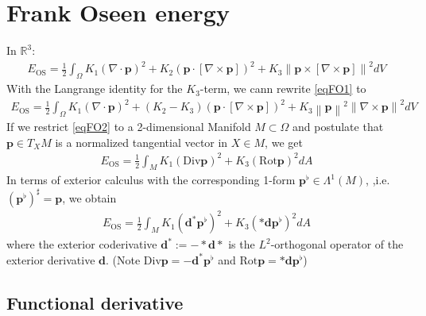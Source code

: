 \documentclass[a4paper,11pt]{scrartcl}
\newcommand{\exd}{\mathbf{d}}
\newcommand{\excod}{\exd^{*}} %
\newcommand{\Div}{\text{Div}}
\newcommand{\Rot}{\text{Rot}}
\newcommand{\R}{\mathds{R}}
\newcommand{\M}{M}
\newcommand{\dA}{dA}
\newcommand{\p}{\mathbf{p}}
\newcommand{\pfl}{\mathbf{p}^{\flat}}
\newcommand{\EOS}{E_{\text{OS}}}
\begin{document}
\tableofcontents

\section{Frank Oseen energy}

In \( \R^{3} \):
\begin{align}\label{eqFO1}
  \EOS = \frac{1}{2}\int_{\Omega} K_{1}\left( \nabla\cdot\p \right)^{2} 
                        + K_{2}\left( \p\cdot\left[ \nabla\times\p \right] \right)^{2}
                        + K_{3}\left\| \p\times\left[ \nabla\times\p \right] \right\|^{2} dV
\end{align}
With the Langrange identity for the \( K_{3} \)-term, we cann rewrite \eqref{eqFO1} to
\begin{align}\label{eqFO2}
  \EOS = \frac{1}{2}\int_{\Omega} K_{1}\left( \nabla\cdot\p \right)^{2} 
                        + (K_{2}-K_{3})\left( \p\cdot\left[ \nabla\times\p \right] \right)^{2}
                        + K_{3}\left\| \p \right\|^{2}\left\| \nabla\times\p \right\|^{2} dV
\end{align}
If we restrict \eqref{eqFO2} to a 2-dimensional Manifold \( \M\subset\Omega \) 
and postulate that \( \p\in T_{X}\M \) is a normalized tangential vector in \( X\in\M \), we get
\begin{align}
  \EOS = \frac{1}{2} \int_{\M} K_{1}\left( \Div\p \right)^{2} + K_{3}\left( \Rot \p \right)^{2} \dA 
\end{align}
In terms of exterior calculus with the corresponding 1-form \( \pfl\in\Lambda^{1}(M) \), 
,i.e. \( \left( \pfl \right)^{\sharp} = \p\), we obtain
\begin{align}
  \EOS = \frac{1}{2} \int_{\M} K_{1}\left( \excod\pfl \right)^{2} + K_{3}\left( *\exd \pfl \right)^{2} \dA
\end{align}
where the exterior coderivative \( \excod := -* \exd * \) is the \( L^{2} \)-orthogonal operator of the exterior derivative \( \exd \). 
(Note \( \Div\p = -\excod\pfl \) and \( \Rot\p = *\exd\pfl \)) 

  \subsection{Functional derivative}
  
\end{document}
